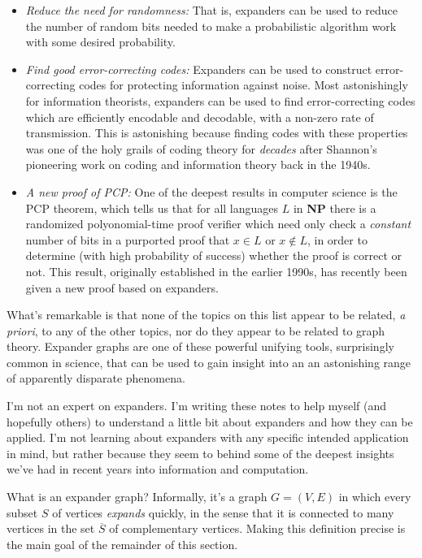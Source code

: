 \documentclass[12pt]{article}
\begin{document}
\begin{itemize}
  
\item \emph{Reduce the need for randomness:} That is, expanders can be
  used to reduce the number of random bits needed to make a
  probabilistic algorithm work with some desired probability.
  
\item \emph{Find good error-correcting codes:} Expanders can be used
  to construct error-correcting codes for protecting information
  against noise.  Most astonishingly for information theorists,
  expanders can be used to find error-correcting codes which are
  efficiently encodable and decodable, with a non-zero rate of
  transmission.  This is astonishing because finding codes with these
  properties was one of the holy grails of coding theory for
  \emph{decades} after Shannon's pioneering work on coding and
  information theory back in the 1940s.
  
\item \emph{A new proof of PCP:} One of the deepest results in
  computer science is the PCP theorem, which tells us that for all
  languages $L$ in \textbf{NP} there is a randomized polyonomial-time
  proof verifier which need only check a \emph{constant} number of
  bits in a purported proof that $x \in L$ or $x \not \in L$, in order
  to determine (with high probability of success) whether the proof is
  correct or not.  This result, originally established in the earlier
  1990s, has recently been given a new proof based on expanders.

\end{itemize}

What's remarkable is that none of the topics on this list appear to be
related, \emph{a priori}, to any of the other topics, nor do they
appear to be related to graph theory.  Expander graphs are one of
these powerful unifying tools, surprisingly common in science, that
can be used to gain insight into an an astonishing range of apparently
disparate phenomena.

I'm not an expert on expanders.  I'm writing these notes to help
myself (and hopefully others) to understand a little bit about
expanders and how they can be applied.  I'm not learning about
expanders with any specific intended application in mind, but rather
because they seem to behind some of the deepest insights we've had in
recent years into information and computation.

What is an expander graph?  Informally, it's a graph $G = (V,E)$ in
which every subset $S$ of vertices \emph{expands} quickly, in the
sense that it is connected to many vertices in the set $\overline S$
of complementary vertices.  Making this definition precise is the main
goal of the remainder of this section.
\end{document}
